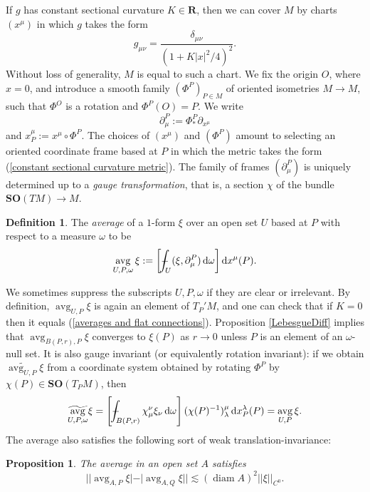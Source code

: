 \documentclass[reqno,10pt]{amsart}
\newcommand{\RR}{\mathbf{R}}
\newcommand{\SpOrth}{\mathbf{SO}}
\DeclareMathOperator{\avg}{avg}
\DeclareMathOperator{\diam}{diam}
\newcommand*\dif{\mathop{}\!\mathrm{d}}
\newcommand{\dfn}[1]{\emph{#1}\index{#1}}
\newtheorem{proposition}[theorem]{Proposition}
\theoremstyle{definition}
\newtheorem{definition}[theorem]{Definition}
\numberwithin{equation}{section}
\def\Xint#1{\mathchoice
{\XXint\displaystyle\textstyle{#1}}%
{\XXint\textstyle\scriptstyle{#1}}%
{\XXint\scriptstyle\scriptscriptstyle{#1}}%
{\XXint\scriptscriptstyle\scriptscriptstyle{#1}}%
\!\int}
\def\XXint#1#2#3{{\setbox0=\hbox{$#1{#2#3}{\int}$ }
\vcenter{\hbox{$#2#3$ }}\kern-.6\wd0}}
\def\dashint{\Xint-}
\begin{document}
If $g$ has constant sectional curvature $K \in \RR$, then we can cover $M$ by charts $(x^\mu)$ in which $g$ takes the form
\begin{equation}\label{constant sectional curvature metric}
g_{\mu\nu} = \frac{\delta_{\mu\nu}}{(1 + K|x|^2/4)^2}.
\end{equation}
Without loss of generality, $M$ is equal to such a chart.
We fix the origin $O$, where $x = 0$, and introduce a smooth family $(\Phi^P)_{P \in M}$ of oriented isometries $M \to M$, such that $\Phi^O$ is a rotation and $\Phi^P(O) = P$.
We write
$$\partial^P_\mu := \Phi^P_* \partial_{x^\mu}$$
and $x^\mu_P := x^\mu \circ \Phi^P$.
The choices of $(x^\mu)$ and $(\Phi^P)$ amount to selecting an oriented coordinate frame based at $P$ in which the metric takes the form (\ref{constant sectional curvature metric}).
The family of frames $(\partial^P_\mu)$ is uniquely determined up to a \dfn{gauge transformation}, that is, a section $\chi$ of the bundle $\SpOrth(TM) \to M$.

\begin{definition}
The \dfn{average} of a $1$-form $\xi$ over an open set $U$ based at $P$ with respect to a measure $\omega$ to be
$$\avg_{U, P, \omega} \xi := \left[\dashint_U (\xi, \partial^P_\mu) \dif \omega\right] \dif x^\mu(P).$$
\end{definition}

We sometimes suppress the subscripts $U, P, \omega$ if they are clear or irrelevant.
By definition, $\avg_{U, P} \xi$ is again an element of $T_P'M$, and one can check that if $K = 0$ then it equals (\ref{averages and flat connections}).
Proposition \ref{LebesgueDiff} implies that $\avg_{B(P, r), P} \xi$ converges to $\xi(P)$ as $r \to 0$ unless $P$ is an element of an $\omega$-null set.
It is also gauge invariant (or equivalently rotation invariant): if we obtain $\widetilde{\avg_{U, P}} \xi$ from a coordinate system obtained by rotating $\Phi^P$ by $\chi(P) \in \SpOrth(T_PM)$, then
$$\widetilde{\avg_{U, P, \omega}} \xi = \left[\dashint_{B(P, r)} \chi^\nu_\mu \xi_\nu \dif \omega\right] (\chi(P)^{-1})_\lambda^\mu \dif x^\lambda_P(P) = \avg_{U, P} \xi.$$
The average also satisfies the following sort of weak translation-invariance:

\begin{proposition}\label{translation invariance}
The average in an open set $A$ satisfies
$$||\avg_{A, P} \xi| - |\avg_{A, Q} \xi|| \lesssim (\diam A)^2 ||\xi||_{C^0}.$$
\end{proposition}
\end{document}
